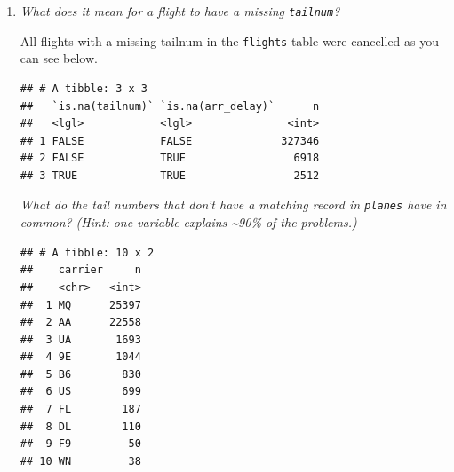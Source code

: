 \documentclass[]{book}
\newenvironment{Shaded}{\begin{snugshade}}{\end{snugshade}}
\newcommand{\DataTypeTok}[1]{\textcolor[rgb]{0.13,0.29,0.53}{#1}}
\newcommand{\KeywordTok}[1]{\textcolor[rgb]{0.13,0.29,0.53}{\textbf{#1}}}
\newcommand{\NormalTok}[1]{#1}
\newcommand{\OperatorTok}[1]{\textcolor[rgb]{0.81,0.36,0.00}{\textbf{#1}}}
\newcommand{\OtherTok}[1]{\textcolor[rgb]{0.56,0.35,0.01}{#1}}
\newcommand{\StringTok}[1]{\textcolor[rgb]{0.31,0.60,0.02}{#1}}
\theoremstyle{definition}
\theoremstyle{definition}
\theoremstyle{definition}
\theoremstyle{remark}
\begin{document}
\begin{enumerate}
\def\labelenumi{\arabic{enumi}.}
\item
  \emph{What does it mean for a flight to have a missing
  \texttt{tailnum}?}

  All flights with a missing tailnum in the \texttt{flights} table were
  cancelled as you can see below.

\begin{Shaded}
\end{Shaded}

\begin{verbatim}
## # A tibble: 3 x 3
##   `is.na(tailnum)` `is.na(arr_delay)`      n
##   <lgl>            <lgl>               <int>
## 1 FALSE            FALSE              327346
## 2 FALSE            TRUE                 6918
## 3 TRUE             TRUE                 2512
\end{verbatim}

  \emph{What do the tail numbers that don't have a matching record in
  \texttt{planes} have in common?} \emph{(Hint: one variable explains
  \textasciitilde{}90\% of the problems.)}

\begin{Shaded}
\end{Shaded}

\begin{verbatim}
## # A tibble: 10 x 2
##    carrier     n
##    <chr>   <int>
##  1 MQ      25397
##  2 AA      22558
##  3 UA       1693
##  4 9E       1044
##  5 B6        830
##  6 US        699
##  7 FL        187
##  8 DL        110
##  9 F9         50
## 10 WN         38
\end{verbatim}


\end{enumerate}
\end{document}
